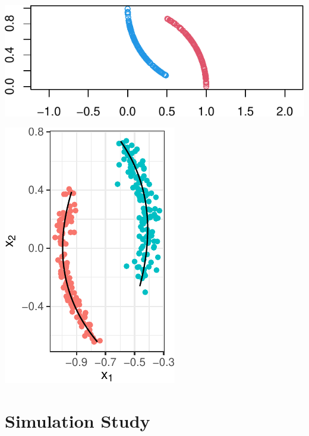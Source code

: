 \documentclass[12pt]{article}
\begin{document}
\begin{example}


\begin{center}\includegraphics{draft_files/figure-latex/unnamed-chunk-12-1} \end{center}






\begin{center}\includegraphics{draft_files/figure-latex/unnamed-chunk-15-1} \end{center}

\end{example}

\hypertarget{simulation-study}{%
\section{Simulation Study}\label{simulation-study}}
\end{document}
